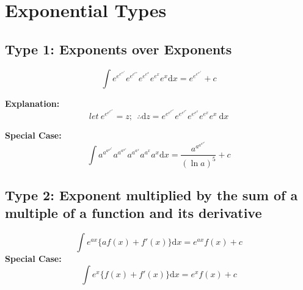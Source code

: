 \section{Exponential Types}
  \subsection{Type 1: Exponents over Exponents}
    \begin{equation}
      \int e^{e^{e^{e^{e^x}}}}e^{e^{e^{e^x}}}e^{e^{e^x}}e^{e^x}e^x \mathrm{d}x
      = e^{e^{e^{e^{e^x}}}} + c
    \end{equation}

    \textbf{Explanation:}
    \begin{equation*}
      let\ e^{e^{e^{e^{e^x}}}} = z;\ \ 
      \therefore \mathrm{d}z = e^{e^{e^{e^{e^x}}}}e^{e^{e^{e^x}}}e^{e^{e^x}}e^{e^x}e^x\ \mathrm{d}x
    \end{equation*}

    \textbf{Special Case:}
    \begin{equation} 
      \int a^{a^{a^{a^{a^x}}}}a^{a^{a^{a^x}}}a^{a^{a^x}}a^{a^x}a^x \mathrm{d}x
      = \frac{a^{a^{a^{a^{a^x}}}}}{(\ln a)^5} + c
    \end{equation}

  \subsection{Type 2: Exponent multiplied by the sum of a multiple of a function and its derivative}
    
    \begin{equation}
      \int e^{ax}\{af(x) + f'(x)\} \mathrm{d}x = e^{ax}f(x) + c
    \end{equation}
    \textbf{Special Case:}
    \begin{equation}
      \int e^x\{f(x) + f'(x)\} \mathrm{d}x = e^x f(x) + c
    \end{equation}

